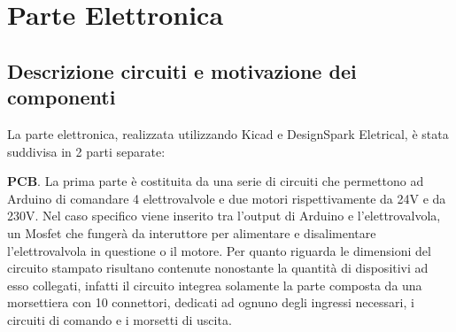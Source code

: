 \documentclass{report}
\begin{document}
\chapter{Parte Elettronica}

\section{Descrizione circuiti e motivazione dei componenti}

La parte elettronica, realizzata utilizzando Kicad e DesignSpark Eletrical, è stata suddivisa in 2 parti separate: 

\begin{description}
\item \textbf{PCB}. La prima parte è costituita da una serie di circuiti che permettono ad Arduino di comandare 4 elettrovalvole e due motori rispettivamente da 24V e da 230V.
Nel caso specifico viene inserito tra l'output di Arduino e l'elettrovalvola, un Mosfet che fungerà da interuttore per alimentare e disalimentare l'elettrovalvola in questione o il motore.
Per quanto riguarda le dimensioni del circuito stampato risultano contenute nonostante la quantità di dispositivi ad esso collegati, infatti il circuito integrea solamente la parte composta da una morsettiera con 10 connettori, dedicati ad ognuno degli ingressi necessari, i circuiti di comando e i morsetti di uscita.


\end{description}
\end{document}
